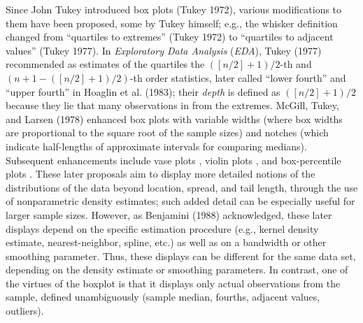 \documentclass[oneside]{article}
\begin{document}
Since John Tukey introduced box plots (Tukey 1972), various 
modifications to them have been proposed, some by Tukey himself;
e.g., the whisker definition changed from ``quartiles to extremes'' 
(Tukey 1972) to ``quartiles to adjacent values'' (Tukey 1977).
In \textit{Exploratory Data Analysis} (\textit{EDA}), 
Tukey (1977) recommended as estimates of the quartiles the
$([n/2] + 1)/2$-th and $(n + 1 - ([n/2] + 1)/2)$-th 
order statistics, later called ``lower fourth'' and 
``upper fourth'' in Hoaglin et al. (1983); their \textit{depth} 
is defined as $([n/2] + 1)/2$ because they lie that
many observations in from the extremes.
McGill, Tukey, and Larsen (1978) enhanced box plots with 
variable widths (where box widths are proportional to the square 
root of the sample sizes) and notches (which indicate half-lengths 
of approximate intervals for comparing medians). 
Subsequent enhancements include vase plots \citep{vase}, violin plots \citep{violin}, and box-percentile plots \citep{box.percentiles}.
These later proposals aim to display more detailed
notions of the distributions of the data beyond location,
spread, and tail length, through the use
of nonparametric density estimates; such added detail can be
especially useful for larger sample sizes.  However, as
Benjamini (1988) acknowledged, these later displays depend 
on the specific estimation procedure
(e.g., kernel density estimate, nearest-neighbor, spline, etc.)
as well as on a bandwidth or other smoothing parameter.
Thus, these displays can be different for the same data set,
depending on the density estimate or smoothing parameters.
In contrast, one of the virtues of the boxplot is that it
displays only actual observations from the sample, defined
unambiguously
(sample median, fourths, adjacent values, outliers).  
\end{document}

